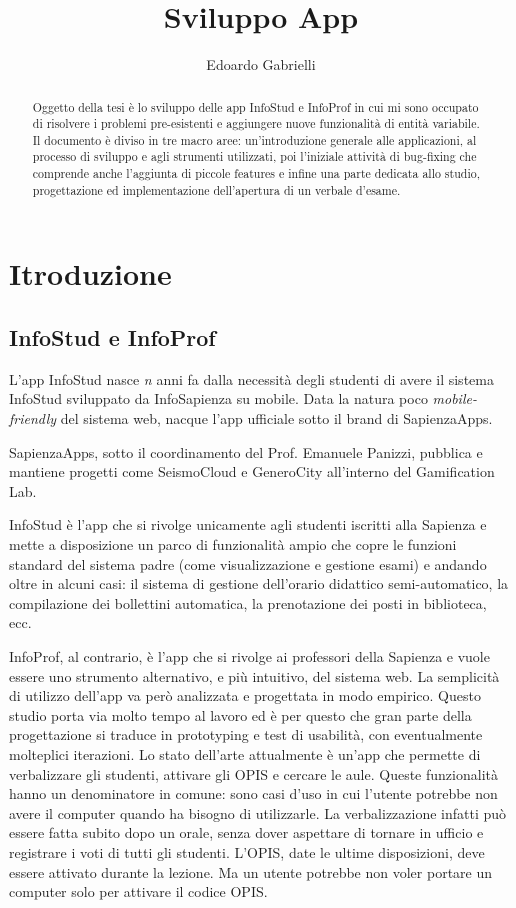 \documentclass[Lau, oneside]{sapthesis}%
\title{Sviluppo App}
\author{Edoardo Gabrielli}
\begin{document}
\frontmatter
\maketitle
\begin{abstract}
Oggetto della tesi è lo sviluppo delle app InfoStud e InfoProf in cui mi sono occupato di risolvere i problemi pre-esistenti e aggiungere nuove funzionalità di entità variabile.
Il documento è diviso in tre macro aree: un'introduzione generale alle applicazioni, al processo di sviluppo e agli strumenti utilizzati, poi l'iniziale attività di bug-fixing che comprende anche l'aggiunta di piccole features e infine una parte dedicata allo studio, progettazione ed implementazione dell'apertura di un verbale d'esame.
\end{abstract}

\tableofcontents

\mainmatter
\chapter{Itroduzione}
\label{ch:1}
\section{InfoStud e InfoProf}
\label{sec:pres}
L'app InfoStud nasce \textit{n} anni fa dalla necessità degli studenti di avere il sistema InfoStud sviluppato da InfoSapienza su mobile.
Data la natura poco \textit{mobile-friendly} del sistema web, nacque l'app ufficiale sotto il brand di SapienzaApps.

SapienzaApps, sotto il coordinamento del Prof. Emanuele Panizzi, pubblica e mantiene progetti come SeismoCloud e GeneroCity all'interno
del Gamification Lab.

InfoStud è l'app che si rivolge unicamente agli studenti iscritti alla Sapienza e mette a disposizione un parco di funzionalità ampio
che copre le funzioni standard del sistema padre (come visualizzazione e gestione esami) e andando oltre in alcuni casi: il sistema
di gestione dell'orario didattico semi-automatico, la compilazione dei bollettini automatica, la prenotazione dei posti in biblioteca, ecc.

InfoProf, al contrario, è l'app che si rivolge ai professori della Sapienza e vuole essere uno strumento alternativo, e più intuitivo, 
del sistema web. La semplicità di utilizzo dell'app va però analizzata e progettata in modo empirico. Questo studio porta via molto tempo 
al lavoro ed è per questo che gran parte della progettazione si traduce in prototyping e test di usabilità, con eventualmente molteplici
iterazioni. Lo stato dell'arte attualmente è un'app che permette di verbalizzare gli studenti, attivare gli OPIS e cercare le aule.
Queste funzionalità hanno un denominatore in comune: sono casi d'uso in cui l'utente potrebbe non avere il computer quando ha bisogno
di utilizzarle. La verbalizzazione infatti può essere fatta subito dopo un orale, senza dover aspettare di tornare in ufficio e 
registrare i voti di tutti gli studenti. L'OPIS, date le ultime disposizioni, deve essere attivato durante la lezione. Ma un utente
potrebbe non voler portare un computer solo per attivare il codice OPIS.
\end{document}
